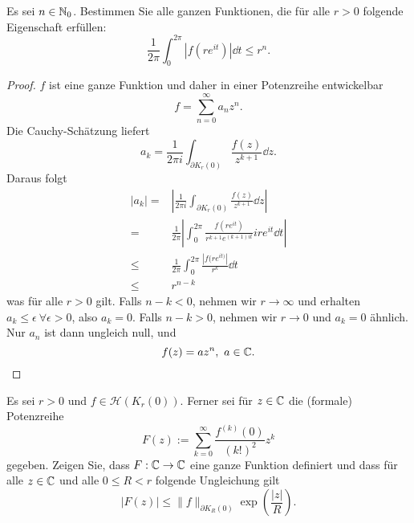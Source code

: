 \begin{Problem}
	Es sei $n\in \mathbb{N}_0$. Bestimmen Sie alle ganzen Funktionen, die für alle $r>0$ folgende Eigenschaft erfüllen:
	\[
	\frac{1}{2\pi}\int_0^{2\pi}|f(re^{it})|\dd{t}\le r^n
	.\] 
\end{Problem}
\begin{proof}
	$f$ ist eine ganze Funktion und daher in einer Potenzreihe entwickelbar
	\[
	f=\sum_{n=0}^{\infty} a_n z^n
	.\] 
	Die Cauchy-Schätzung liefert
	\[
	a_k=\frac{1}{2\pi i}\int_{\partial K_r(0)} \frac{f(z)}{z^{k+1}}\dd{z}
	.\] 
	Daraus folgt
	\begin{align*}
		|a_k|=&\left| \frac{1}{2\pi i}\int_{\partial K_r(0)} \frac{f(z)}{z^{k+1}}\dd{z} \right| \\
		=&\frac{1}{2\pi}\left| \int_0^{2\pi} \frac{f(re^{it})}{r^{k+1}e^{(k+1)it}}ire^{it}\dd{t} \right|\\
		\le& \frac{1}{2\pi}\int_0^{2\pi} \frac{|f(re^{it)}|}{r^k}\dd{t}\\
		\le&r^{n-k}
	\end{align*}
	was für alle $r>0$ gilt. Falls $n-k<0$, nehmen wir $r\to \infty$ und erhalten $a_k\le \epsilon~\forall \epsilon>0$, also $a_k=0$. Falls $n-k>0$, nehmen wir $r\to 0$ und $a_k=0$ ähnlich. Nur $a_n$ ist dann ungleich null, und
	\[
	f(z)=az^n,~a\in \mathbb{C}
	.\qedhere\] 
\end{proof}
\begin{Problem}
	Es sei $r>0$ und $f\in \mathcal{H}(K_r(0)) $. Ferner sei für $z\in \mathbb{C}$ die (formale) Potenzreihe
	\[
	F(z):=\sum_{k=0}^{\infty} \frac{f^{(k)}(0)}{(k!)^2}z^k
	\]
	gegeben. Zeigen Sie, dass $F:\mathbb{C}\to \mathbb{C}$ eine ganze Funktion definiert und dass für alle $z\in \mathbb{C}$ und alle $0\le R < r$ folgende Ungleichung gilt
	\[
	|F(z)|\le \|f\|_{\partial K_R(0)}\exp\left( \frac{|z|}{R} \right) 
	.\] 
\end{Problem}

